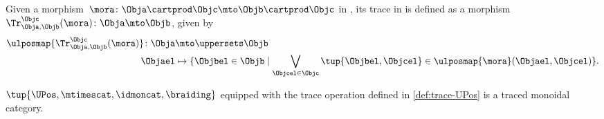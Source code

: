 \begin{definition}
	\label{def:trace-UPos}
	Given a morphism~$\mora\colon \Obja \cartprod \Objc \mto \Objb\cartprod \Objc$ in \UPos, its trace in is defined as a morphism~$\Tr_{\Obja,\Objb}^{\Objc}(\mora)\colon \Obja \mto \Objb$, given by
	\begin{equation}
		\begin{aligned}
			\ulposmap{\Tr_{\Obja,\Objb}^{\Objc}(\mora)}\colon \Obja & \mto \uppersets \Objb                                                                                                      \\
			\Objael                                                 & \mapsto \{\Objbel \in \Objb \mid \bigvee_{\Objcel \in \Objc}\tup{\Objbel, \Objcel}\in \ulposmap{\mora}(\Objael,\Objcel)\}.
		\end{aligned}
	\end{equation}
\end{definition}
\begin{lemma}
	\label{lem:UPos-is-traced}
	$\tup{\UPos,\mtimescat, \idmoncat,\braiding}$ equipped with the trace operation defined in \cref{def:trace-UPos} is a traced monoidal category.
\end{lemma}
